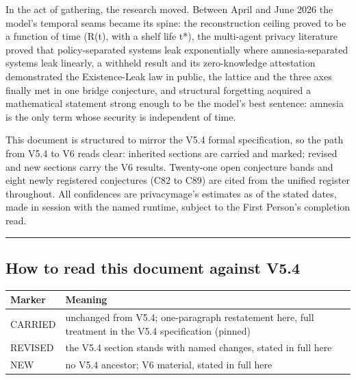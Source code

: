 \documentclass[
  11pt,
]{article}
\newcounter{none} %
\begin{document}
In the act of gathering, the research moved. Between April and June 2026
the model's temporal seams became its spine: the reconstruction ceiling
proved to be a function of time (R(t), with a shelf life t*), the
multi-agent privacy literature proved that policy-separated systems leak
exponentially where amnesia-separated systems leak linearly, a withheld
result and its zero-knowledge attestation demonstrated the
Existence-Leak law in public, the lattice and the three axes finally met
in one bridge conjecture, and structural forgetting acquired a
mathematical statement strong enough to be the model's best sentence:
amnesia is the only term whose security is independent of time.

This document is structured to mirror the V5.4 formal specification, so
the path from V5.4 to V6 reads clear: inherited sections are carried and
marked; revised and new sections carry the V6 results. Twenty-one open
conjecture bands and eight newly registered conjectures (C82 to C89) are
cited from the unified register throughout. All confidences are
privacymage's estimates as of the stated dates, made in session with the
named runtime, subject to the First Person's completion read.

\begin{center}\rule{0.5\linewidth}{0.5pt}\end{center}

\subsection{How to read this document against
V5.4}\label{how-to-read-this-document-against-v5.4}

{\def\LTcaptype{none} %
\begin{longtable}[]{@{}
  >{\raggedright\arraybackslash}p{}
  >{\raggedright\arraybackslash}p{}@{}}
\toprule\noalign{}
\begin{minipage}[b]{\linewidth}\raggedright
Marker
\end{minipage} & \begin{minipage}[b]{\linewidth}\raggedright
Meaning
\end{minipage} \\
\midrule\noalign{}
\endhead
\bottomrule\noalign{}
\endlastfoot
CARRIED & unchanged from V5.4; one-paragraph restatement here, full
treatment in the V5.4 specification (pinned) \\
REVISED & the V5.4 section stands with named changes, stated in full
here \\
NEW & no V5.4 ancestor; V6 material, stated in full here \\
\end{longtable}
}
\end{document}
